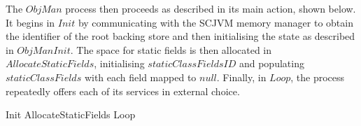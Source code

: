 The $ObjMan$ process then proceeds as described in its main action,
shown below.
It begins in $Init$ by communicating with the SCJVM memory manager to
obtain the identifier of the root backing store and then initialising
the state as described in $ObjManInit$.
The space for static fields is then allocated in
$AllocateStaticFields$, initialising $staticClassFieldsID$ and
populating $staticClassFields$ with each field mapped to $null$.
Finally, in $Loop$, the process repeatedly offers each of its services
in external choice.
\begin{circusaction}
  \circspot Init \circseq AllocateStaticFields \circseq Loop
\end{circusaction}


